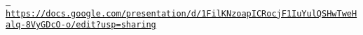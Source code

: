 \href{https://docs.google.com/presentation/d/1FilKNzoapICRocjF1IuYulQSHwTweHalq-8VyGDcO-o/edit?usp=sharing}{\texttt{ https\+://docs.\+google.\+com/presentation/d/1\+Fil\+K\+Nzoap\+I\+C\+Rocj\+F1\+Iu\+Yul\+Q\+S\+Hw\+Twe\+Halq-\/8\+Vy\+G\+Dc\+O-\/o/edit?usp=sharing}} 